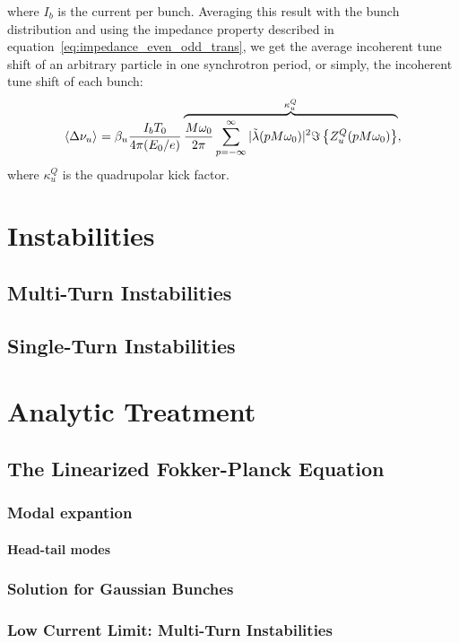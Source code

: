     where $I_b$ is the current per bunch. Averaging this result with the bunch distribution and using the impedance property described in equation~\eqref{eq:impedance_even_odd_trans}, we get the average incoherent tune shift of an arbitrary particle in one synchrotron period, or simply, the incoherent tune shift of each bunch:
    \begin{align}\label{eq:incoherent_tune_shift}
        \left\langle \Delta\nu_u \right\rangle_{{}} = \beta_u\frac{I_bT_0}{4\pi(E_0/e)}
        \overbrace{
        \frac{M\omega_0}{2\pi} \sum_{p=-\infty}^\infty |\tilde{\lambda}(pM\omega_0)|^2\Im\left\{Z^Q_u(pM\omega_0)\right\}}^{\kappa^Q_u},
    \end{align}
    where $\kappa^Q_u$ is the quadrupolar kick factor.

\section{Instabilities}



\subsection{Multi-Turn Instabilities}
\subsection{Single-Turn Instabilities}
\section{Analytic Treatment}
\subsection{The Linearized Fokker-Planck Equation}
\subsubsection{Modal expantion}
\paragraph{Head-tail modes}
\subsubsection{Solution for Gaussian Bunches}
\subsubsection{Low Current Limit: Multi-Turn Instabilities}
